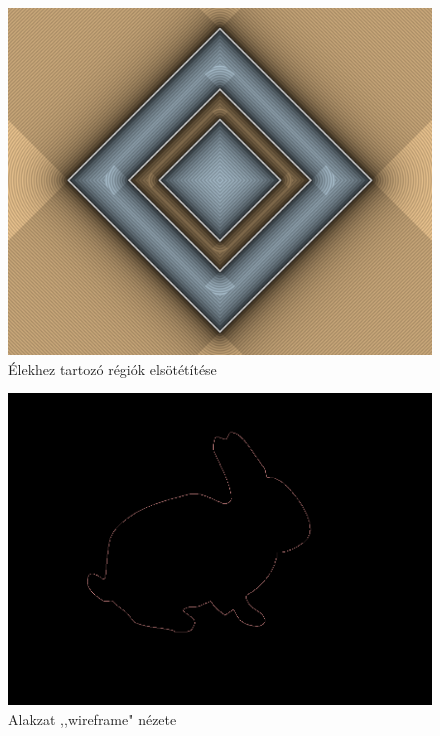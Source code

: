 \begin{figure}[H]
    \centering
    \includegraphics[width=0.85\linewidth]{images/darken_segment_regions.png}
    \caption{Élekhez tartozó régiók elsötétítése}
    \label{fig:darken_segment_regions-1}
\end{figure}

\begin{figure}[H]
    \centering
    \includegraphics[width=0.85\linewidth]{images/outline_only.png}
    \caption{Alakzat ,,wireframe" nézete}
    \label{fig:outline_only-1}
\end{figure}

